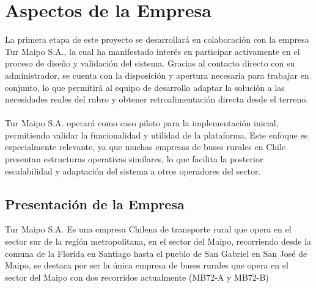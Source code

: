 \documentclass[12pt]{article}
\begin{document}
\section{Aspectos de la Empresa}
La primera etapa de este proyecto se desarrollará en colaboración con la empresa Tur Maipo S.A., la cual ha manifestado interés en participar activamente en el proceso de diseño y validación del sistema. Gracias al contacto directo con su administrador, se cuenta con la disposición y apertura necesaria para trabajar en conjunto, lo que permitirá al equipo de desarrollo adaptar la solución a las necesidades reales del rubro y obtener retroalimentación directa desde el terreno.
\\\\
Tur Maipo S.A. operará como caso piloto para la implementación inicial, permitiendo validar la funcionalidad y utilidad de la plataforma. Este enfoque es especialmente relevante, ya que muchas empresas de buses rurales en Chile presentan estructuras operativas similares, lo que facilita la posterior escalabilidad y adaptación del sistema a otros operadores del sector.  
\subsection{Presentación de la Empresa}
Tur Maipo S.A. Es una empresa Chilena de transporte rural que opera en el sector sur de la región metropolitana, en el sector del Maipo, recorriendo desde la comuna de la Florida en Santiago hasta el pueblo de San Gabriel en San José de Maipo, se destaca por ser la única empresa de buses rurales que opera en el sector del Maipo con dos recorridos actualmente (MB72-A y MB72-B)
\newpage
\end{document}

